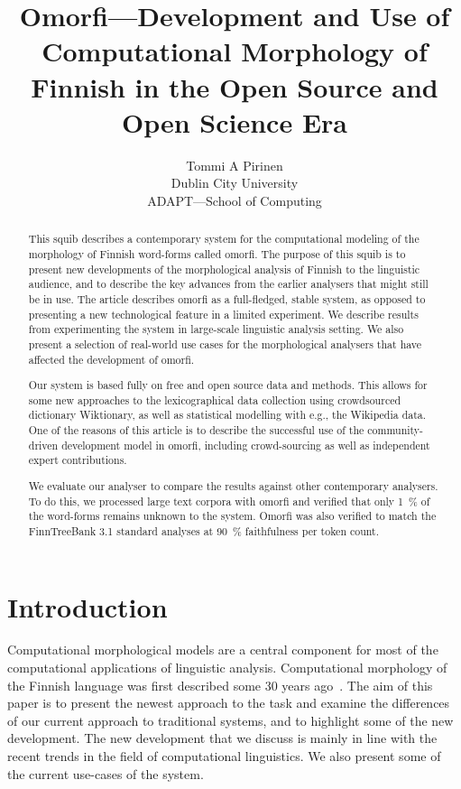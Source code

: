 \documentclass[a4paper,12pt]{article}
\title{Omorfi---Development and Use of Computational Morphology of Finnish in
the Open Source and Open Science Era}
\author{Tommi A Pirinen \\
    Dublin City University\\
    ADAPT---School of Computing}
\date{}
\begin{document}
\maketitle
\begin{abstract}

    This squib describes a contemporary system for the computational modeling
    of the morphology of Finnish word-forms called omorfi. The purpose of this
    squib is to present new developments of the morphological analysis of
    Finnish to the linguistic audience, and to describe the key advances from
    the earlier analysers that might still be in use. The article describes
    omorfi as a full-fledged, stable system, as opposed to presenting a new
    technological feature in a limited experiment. We describe results from
    experimenting the system in large-scale linguistic analysis setting. We also
    present a selection of real-world use cases for the morphological analysers
    that have affected the development of omorfi.

    Our system is based fully on free and open source data and methods. This
    allows for some new approaches to the lexicographical data collection using
    crowd\-sour\-ced dictionary Wiktionary, as well as statistical modelling
    with e.g., the Wikipedia data.  One of the reasons of this article is to 
    describe the successful use of the community-driven development model in
    omorfi, including crowd-sourcing as well as independent expert
    contributions.

    We evaluate our analyser to compare the results against other contemporary
    analysers. To do this, we processed large text corpora with omorfi
    and verified that only 1~\% of the word-forms remains unknown to the
    system. Omorfi was also verified to match the FinnTreeBank 3.1 standard
    analyses at 90~\% faithfulness per token count.
\end{abstract}

\section{Introduction}

Computational morphological models are a central component for most of the
computational applications of linguistic analysis. Computational morphology
of the Finnish language was first described some 30 years
ago~\citep{koskenniemi1983twolevel}. The aim of this paper is to present the
newest approach to the task and examine the differences of our current approach
to traditional systems, and to highlight some of the new development. The
new development that we discuss is mainly in line with the recent trends in
the field of computational linguistics. We also present some of the current
use-cases of the system.
\end{document}
